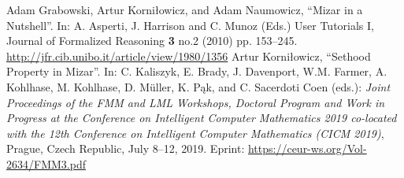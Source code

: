 \begin{thebibliography}{99}
  Adam Grabowski, Artur Korni{\l}owicz, and Adam Naumowicz,
  ``Mizar in a Nutshell''.
  In: A. Asperti, J. Harrison and C. Munoz (Eds.) User Tutorials I,
  Journal of Formalized Reasoning \textbf{3} no.2 (2010) pp. 153--245. 
  \url{http://jfr.cib.unibo.it/article/view/1980/1356}
  Artur Korni{\l}owicz,
  ``Sethood Property in Mizar''.
  In: C. Kaliszyk, E. Brady, J. Davenport, W.M. Farmer, A. Kohlhase, M. Kohlhase, D. M\"{u}ller, K. P{\k{a}}k, and C. Sacerdoti Coen (eds.): \textit{Joint Proceedings of the FMM and LML Workshops, Doctoral Program and Work in Progress at the Conference on Intelligent Computer Mathematics 2019 co-located with the 12th Conference on Intelligent Computer Mathematics (CICM 2019)}, Prague, Czech Republic, July 8--12, 2019.
  Eprint: \url{https://ceur-ws.org/Vol-2634/FMM3.pdf}
\end{thebibliography}
